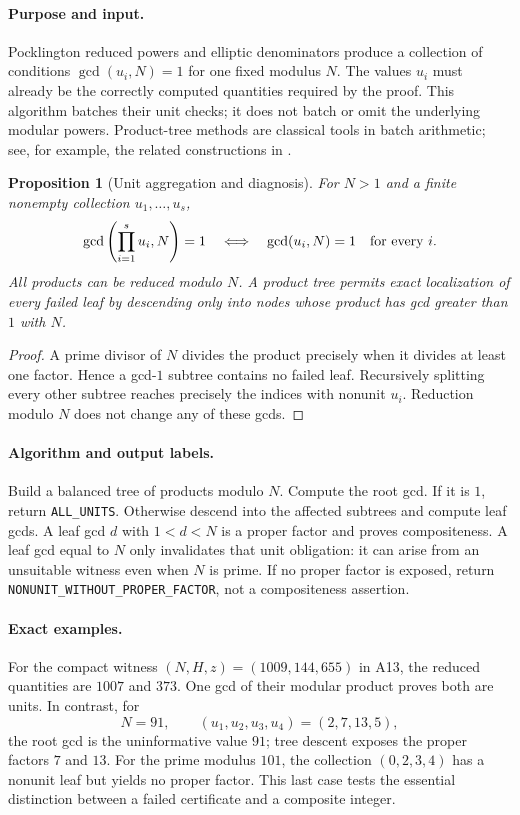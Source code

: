 \documentclass[11pt,a4paper]{article}
\newtheorem{proposition}[theorem]{Proposition}
\theoremstyle{definition}\newtheorem{definition}[theorem]{Definition}
\theoremstyle{remark}\newtheorem{remark}[theorem]{Remark}
\begin{document}
\paragraph{Purpose and input.}
Pocklington reduced powers and elliptic denominators produce a collection
of conditions $\gcd(u_i,N)=1$ for one fixed modulus $N$.  The values $u_i$
must already be the correctly computed quantities required by the proof.
This algorithm batches their unit checks; it does not batch or omit the
underlying modular powers.  Product-tree methods are classical tools in
batch arithmetic; see, for example, the related constructions in
\cite{cert-batchgcd}.

\begin{proposition}[Unit aggregation and diagnosis]\label{prop:cert-unit}
For $N>1$ and a finite nonempty collection $u_1,\ldots,u_s$,
\[
 \gcd\left(\prod_{i=1}^s u_i,N\right)=1
 \quad\Longleftrightarrow\quad
 \gcd(u_i,N)=1\quad\hbox{for every }i.
\]
All products can be reduced modulo $N$.  A product tree permits exact
localization of every failed leaf by descending only into nodes whose
product has gcd greater than $1$ with $N$.
\end{proposition}

\begin{proof}
A prime divisor of $N$ divides the product precisely when it divides at
least one factor.  Hence a gcd-$1$ subtree contains no failed leaf.
Recursively splitting every other subtree reaches precisely the indices
with nonunit $u_i$.  Reduction modulo $N$ does not change any of these gcds.
\end{proof}

\paragraph{Algorithm and output labels.}
Build a balanced tree of products modulo $N$.  Compute the root gcd.  If
it is $1$, return \texttt{ALL\_UNITS}.  Otherwise descend into the affected
subtrees and compute leaf gcds.  A leaf gcd $d$ with $1<d<N$ is a proper
factor and proves compositeness.  A leaf gcd equal to $N$ only invalidates
that unit obligation: it can arise from an unsuitable witness even when
$N$ is prime.  If no proper factor is exposed, return
\texttt{NONUNIT\_WITHOUT\_PROPER\_FACTOR}, not a compositeness assertion.

\paragraph{Exact examples.}
For the compact witness $(N,H,z)=(1009,144,655)$ in A13, the reduced
quantities are $1007$ and $373$.  One gcd of their modular product proves
both are units.  In contrast, for
\[
 N=91,\qquad (u_1,u_2,u_3,u_4)=(2,7,13,5),
\]
the root gcd is the uninformative value $91$; tree descent exposes the
proper factors $7$ and $13$.  For the prime modulus $101$, the collection
$(0,2,3,4)$ has a nonunit leaf but yields no proper factor.  This last case
tests the essential distinction between a failed certificate and a
composite integer.
\end{document}
